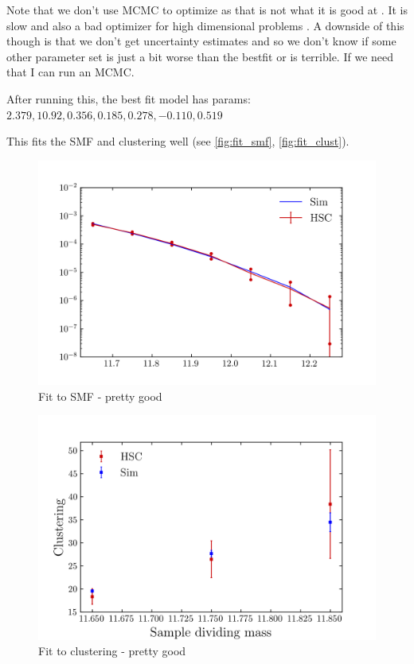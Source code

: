 \documentclass{article}
\begin{document}
Note that we don't use MCMC to optimize as that is not what it is good at \cite{Hogg2018}. It is slow and also a bad optimizer for high dimensional problems \cite{Betancourt2017}. A downside of this though is that we don't get uncertainty estimates and so we don't know if some other parameter set is just a bit worse than the bestfit or is terrible. If we need that I can run an MCMC.

After running this, the best fit model has params: \\$2.379, 10.92,  0.356,  0.185,  0.278, -0.110, 0.519$

This fits the SMF and clustering well (see \autoref{fig:fit_smf}, \autoref{fig:fit_clust}).

\begin{figure}[h]
    \includegraphics[width=\textwidth]{images/fit_smf.png}
    \caption{Fit to SMF - pretty good
        \label{fig:fit_smf}
    }
\end{figure}

\begin{figure}[h]
    \includegraphics[width=\textwidth]{images/fit_clust.png}
    \caption{Fit to clustering - pretty good
    \label{fig:fit_clust}
    }
\end{figure}
\end{document}
